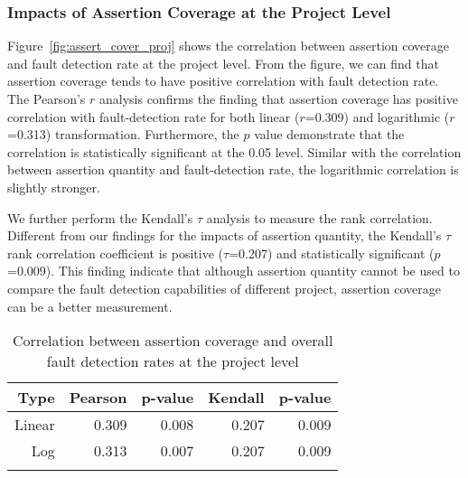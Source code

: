 \subsubsection{Impacts of Assertion Coverage at the Project Level}

Figure~\ref{fig:assert_cover_proj} shows the correlation between
assertion coverage and fault detection rate at the project level. From
the figure, we can find that assertion coverage tends to have positive
correlation with fault detection rate. The Pearson's $r$ analysis
confirms the finding that assertion coverage has positive correlation
with fault-detection rate for both linear ($r$=0.309) and logarithmic
($r$=0.313) transformation. Furthermore, the
$p$ value demonstrate that the correlation is statistically
significant at the 0.05 level. Similar with the correlation between
assertion quantity and fault-detection rate, the logarithmic
correlation is slightly stronger.

We further perform the Kendall's $\tau$ analysis to measure the rank
correlation. Different from our findings for the impacts of assertion
quantity, the Kendall's $\tau$ rank correlation coefficient is
positive ($\tau$=0.207) and statistically significant
($p$=0.009). This finding indicate that although assertion quantity
cannot be used to compare the fault detection capabilities of
different project, assertion coverage can be a better measurement.



\begin{table}[!t]
\renewcommand{\arraystretch}{1.3}
\tiny
\caption{Correlation between assertion coverage and overall fault detection rates at the project level}
\label{table:t_cor_ass_test}
\centering
\begin{tabular}
{rrrrr}
\Xhline{2\arrayrulewidth}
Type & Pearson & p-value & Kendall & p-value\\
\hline
Linear & 0.309 & 0.008 &0.207 & 0.009\\
Log & 0.313    & 0.007 &0.207 & 0.009\\
\Xhline{2\arrayrulewidth}
\end{tabular}
\end{table}

